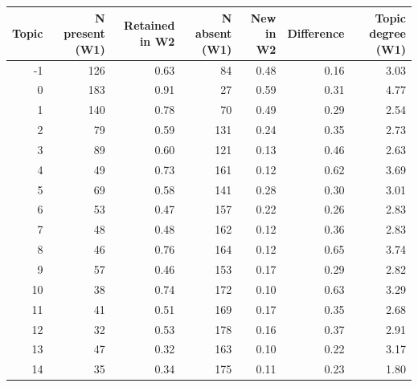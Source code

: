 \begin{tabular}{rrrrrrr}
\toprule
Topic & N present (W1) & Retained in W2 & N absent (W1) & New in W2 & Difference & Topic degree (W1) \\
\midrule
-1 & 126 & 0.63 & 84 & 0.48 & 0.16 & 3.03 \\
0 & 183 & 0.91 & 27 & 0.59 & 0.31 & 4.77 \\
1 & 140 & 0.78 & 70 & 0.49 & 0.29 & 2.54 \\
2 & 79 & 0.59 & 131 & 0.24 & 0.35 & 2.73 \\
3 & 89 & 0.60 & 121 & 0.13 & 0.46 & 2.63 \\
4 & 49 & 0.73 & 161 & 0.12 & 0.62 & 3.69 \\
5 & 69 & 0.58 & 141 & 0.28 & 0.30 & 3.01 \\
6 & 53 & 0.47 & 157 & 0.22 & 0.26 & 2.83 \\
7 & 48 & 0.48 & 162 & 0.12 & 0.36 & 2.83 \\
8 & 46 & 0.76 & 164 & 0.12 & 0.65 & 3.74 \\
9 & 57 & 0.46 & 153 & 0.17 & 0.29 & 2.82 \\
10 & 38 & 0.74 & 172 & 0.10 & 0.63 & 3.29 \\
11 & 41 & 0.51 & 169 & 0.17 & 0.35 & 2.68 \\
12 & 32 & 0.53 & 178 & 0.16 & 0.37 & 2.91 \\
13 & 47 & 0.32 & 163 & 0.10 & 0.22 & 3.17 \\
14 & 35 & 0.34 & 175 & 0.11 & 0.23 & 1.80 \\
\bottomrule
\end{tabular}
